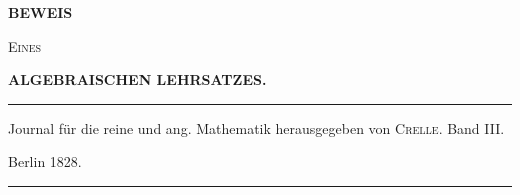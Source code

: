 \clearpage
{}
\thispagestyle{empty}
\begin{center}
\vspace*{2cm}
{\Large\bfseries BEWEIS}\par
\vspace{1cm}
\textsc{Eines}\par
\vspace{1cm}
{\Large\bfseries ALGEBRAISCHEN LEHRSATZES.}\par
\vspace{3cm}
\rule{0.85\linewidth}{0.4pt}\par\medskip
Journal für die reine und ang. Mathematik herausgegeben von \textsc{Crelle}. Band III.\par
\medskip Berlin 1828.\par\medskip
\rule{0.85\linewidth}{0.4pt}
\end{center}
\clearpage
